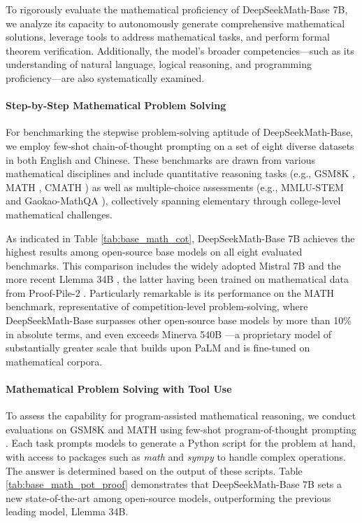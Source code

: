 To rigorously evaluate the mathematical proficiency of DeepSeekMath-Base 7B, we analyze its capacity to autonomously generate comprehensive mathematical solutions, leverage tools to address mathematical tasks, and perform formal theorem verification. Additionally, the model’s broader competencies—such as its understanding of natural language, logical reasoning, and programming proficiency—are also systematically examined.

\paragraph{Step-by-Step Mathematical Problem Solving}

For benchmarking the stepwise problem-solving aptitude of DeepSeekMath-Base, we employ few-shot chain-of-thought prompting \citep{cot} on a set of eight diverse datasets in both English and Chinese. These benchmarks are drawn from various mathematical disciplines and include quantitative reasoning tasks (e.g., GSM8K \citep{gsm8k}, MATH \citep{MATH}, CMATH \citep{wei2023cmath}) as well as multiple-choice assessments (e.g., MMLU-STEM \citep{mmlu} and Gaokao-MathQA \citep{agieval}), collectively spanning elementary through college-level mathematical challenges.

As indicated in Table \ref{tab:base_math_cot}, DeepSeekMath-Base 7B achieves the highest results among open-source base models on all eight evaluated benchmarks. This comparison includes the widely adopted Mistral 7B \citep{mistral} and the more recent Llemma 34B \citep{llemma}, the latter having been trained on mathematical data from Proof-Pile-2 \citep{llemma}. Particularly remarkable is its performance on the MATH benchmark, representative of competition-level problem-solving, where DeepSeekMath-Base surpasses other open-source base models by more than 10\% in absolute terms, and even exceeds Minerva 540B \citep{minerva}—a proprietary model of substantially greater scale that builds upon PaLM \citep{palm} and is fine-tuned on mathematical corpora.

\paragraph{Mathematical Problem Solving with Tool Use} To assess the capability for program-assisted mathematical reasoning, we conduct evaluations on GSM8K and MATH using few-shot program-of-thought prompting \citep{pot,pal}. Each task prompts models to generate a Python script for the problem at hand, with access to packages such as \textit{math} and \textit{sympy} to handle complex operations. The answer is determined based on the output of these scripts. Table \ref{tab:base_math_pot_proof} demonstrates that DeepSeekMath-Base 7B sets a new state-of-the-art among open-source models, outperforming the previous leading model, Llemma 34B.

